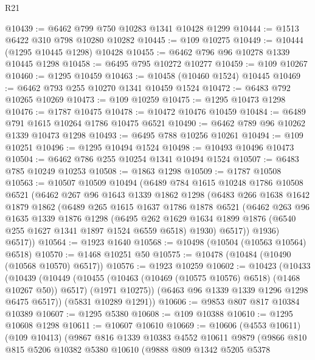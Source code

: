 \begin{lexlean}{R21}
\begin{coremodule}
@10439 := @6462 @799 @750 @10283 @1341 @10428 @1299
@10444 := @1513 @6422 @310 @798 @10280 @10282
@10445 := @109 @10275
@10449 := @10444 (@1295 @10445 @1298) @10428
@10455 := @6462 @796 @96 @10278 @1339 @10445 @1298
@10458 := @6495 @795 @10272 @10277
@10459 := @109 @10267
@10460 := @1295 @10459
@10463 := @10458 (@10460 @1524) @10445
@10469 := @6462 @793 @255 @10270 @1341 @10459 @1524
@10472 := @6483 @792 @10265 @10269
@10473 := @109 @10259
@10475 := @1295 @10473 @1298
@10476 := @1787 @10475
@10478 := @10472 @10476 @10459
@10484 := @6489 @791 @1615 @10264 @1786 @10475 @6521
@10490 := @6462 @789 @96 @10262 @1339 @10473 @1298
@10493 := @6495 @788 @10256 @10261
@10494 := @109 @10251
@10496 := @1295 @10494 @1524
@10498 := @10493 @10496 @10473
@10504 := @6462 @786 @255 @10254 @1341 @10494 @1524
@10507 := @6483 @785 @10249 @10253
@10508 := @1863 @1298
@10509 := @1787 @10508
@10563 := @10507
    @10509
    @10494
    (@6489
      @784
      @1615
      @10248
      @1786
      @10508
      @6521
      (@6462
        @267
        @96
        @1643
        @1339
        @1862
        @1298
        (@6483
          @266
          @1638
          @1642
          @1879
          @1862
          (@6489
            @265
            @1615
            @1637
            @1786
            @1878
            @6521
            (@6462
              @263
              @96
              @1635
              @1339
              @1876
              @1298
              (@6495
                @262
                @1629
                @1634
                @1899
                @1876
                (@6540 @255 @1627 @1341 @1897 @1524 @6559 @6518)
                @1930)
              @6517))
          @1936)
        @6517))
@10564 := @1923 @1640
@10568 := @10498 (@10504 (@10563 @10564) @6518)
@10570 := @1468 @10251 @50
@10575 := @10478 (@10484 (@10490 (@10568 @10570) @6517))
@10576 := @1923 @10259
@10602 := @10423
    (@10433
      (@10439
        (@10449
          (@10455 (@10463 (@10469 (@10575 @10576) @6518) (@1468 @10267 @50)) @6517)
          (@1971 @10275))
        (@6463 @96 @1339 @1339 @1296 @1298 @6475 @6517))
      (@5831 @10289 @1291))
@10606 := @9853 @807 @817 @10384 @10389
@10607 := @1295 @5380
@10608 := @109 @10388
@10610 := @1295 @10608 @1298
@10611 := @10607 @10610
@10669 := @10606
    (@4553 @10611)
    (@109 @10413)
    (@9867
      @816
      @1339
      @10383
      @4552
      @10611
      @9879
      (@9866
        @810
        @815
        @5206
        @10382
        @5380
        @10610
        (@9888
          @809
          @1342
          @5205
          @5378

\end{coremodule}
\end{lexlean}
